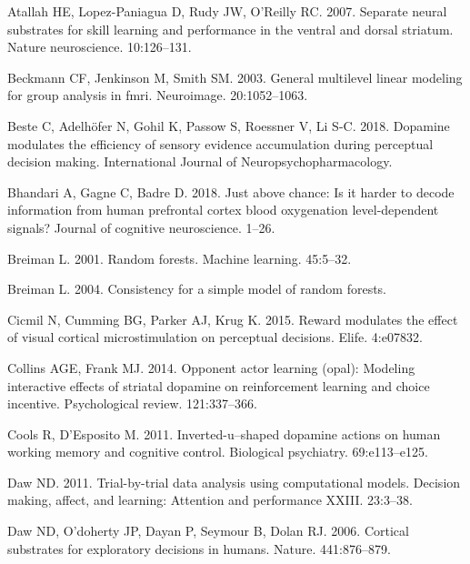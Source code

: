 \documentclass[]{article}
\begin{document}
\leavevmode\hypertarget{ref-Atallahetal2007}{}%
Atallah HE, Lopez-Paniagua D, Rudy JW, O'Reilly RC. 2007. Separate
neural substrates for skill learning and performance in the ventral and
dorsal striatum. Nature neuroscience. 10:126--131.

\leavevmode\hypertarget{ref-Beckmannetal2003}{}%
Beckmann CF, Jenkinson M, Smith SM. 2003. General multilevel linear
modeling for group analysis in fmri. Neuroimage. 20:1052--1063.

\leavevmode\hypertarget{ref-Besteetal2018}{}%
Beste C, Adelhöfer N, Gohil K, Passow S, Roessner V, Li S-C. 2018.
Dopamine modulates the efficiency of sensory evidence accumulation
during perceptual decision making. International Journal of
Neuropsychopharmacology.

\leavevmode\hypertarget{ref-Bhandarietal2018}{}%
Bhandari A, Gagne C, Badre D. 2018. Just above chance: Is it harder to
decode information from human prefrontal cortex blood oxygenation
level-dependent signals? Journal of cognitive neuroscience. 1--26.

\leavevmode\hypertarget{ref-Breiman2001}{}%
Breiman L. 2001. Random forests. Machine learning. 45:5--32.

\leavevmode\hypertarget{ref-Breiman2004}{}%
Breiman L. 2004. Consistency for a simple model of random forests.

\leavevmode\hypertarget{ref-Cicmiletal2015}{}%
Cicmil N, Cumming BG, Parker AJ, Krug K. 2015. Reward modulates the
effect of visual cortical microstimulation on perceptual decisions.
Elife. 4:e07832.

\leavevmode\hypertarget{ref-CollinsFrank2014}{}%
Collins AGE, Frank MJ. 2014. Opponent actor learning (opal): Modeling
interactive effects of striatal dopamine on reinforcement learning and
choice incentive. Psychological review. 121:337--366.

\leavevmode\hypertarget{ref-CoolsDesposito2011}{}%
Cools R, D'Esposito M. 2011. Inverted-u--shaped dopamine actions on
human working memory and cognitive control. Biological psychiatry.
69:e113--e125.

\leavevmode\hypertarget{ref-Daw2011}{}%
Daw ND. 2011. Trial-by-trial data analysis using computational models.
Decision making, affect, and learning: Attention and performance XXIII.
23:3--38.

\leavevmode\hypertarget{ref-Dawetal2006}{}%
Daw ND, O'doherty JP, Dayan P, Seymour B, Dolan RJ. 2006. Cortical
substrates for exploratory decisions in humans. Nature. 441:876--879.
\end{document}

